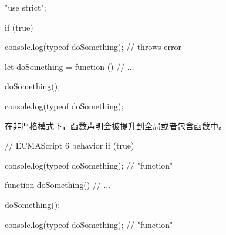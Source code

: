 \begin{JavaScript}
"use strict";

if (true) {

    console.log(typeof doSomething);        // throws error

    let doSomething = function () {
        // ...
    }

    doSomething();
}

console.log(typeof doSomething);
\end{JavaScript}

在非严格模式下，函数声明会被提升到全局或者包含函数中。

\begin{JavaScript}
// ECMAScript 6 behavior
if (true) {

    console.log(typeof doSomething);        // "function"

    function doSomething() {
        // ...
    }

    doSomething();
}

console.log(typeof doSomething);            // "function"
\end{JavaScript}


